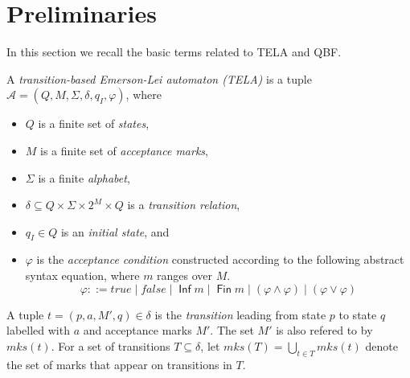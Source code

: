 \documentclass[a4paper,UKenglish,cleveref,autoref,thm-restate]{lipics-v2021}
\DeclareMathOperator{\Inf}{\mathsf{Inf}}
\DeclareMathOperator{\Fin}{\mathsf{Fin}}
\newcommand{\minf}{\mathit{inf}}
\newcommand{\mks}{\mathit{mks}}
\def\false{\mathit{false}}
\def\true{\mathit{true}}
\newcommand{\mA}{\mathcal{A}}
\begin{document}

\section{Preliminaries}\label{sec:prelim}

In this section we recall the basic terms related to TELA and QBF.

\begin{definition}[TELA]
  A \emph{transition-based Emerson-Lei automaton (TELA)} is a tuple
  $\mA =(Q,M,\Sigma,\delta,q_I,\varphi)$, where
  \begin{itemize}
  \item $Q$ is a finite set of \emph{states},
  \item $M$ is a finite set of \emph{acceptance marks},
  \item $\Sigma$ is a finite \emph{alphabet},
  \item $\delta \subseteq Q \times \Sigma \times 2^{M} \times Q$ is a
    \emph{transition relation},
  \item $q_I\in Q$ is an \emph{initial state}, and
  \item $\varphi$ is the \emph{acceptance condition} constructed
    according to the following abstract syntax equation, where $m$
    ranges over $M$.
    $$\varphi ::= \true \mid \false \mid \Inf m \mid \Fin m \mid \left( \varphi \land \varphi \right) \mid \left( \varphi \lor \varphi \right)$$
\end{itemize}
\end{definition}

A tuple $t=(p,a,M',q)\in\delta$ is the \emph{transition} leading from
state $p$ to state $q$ labelled with $a$ and acceptance marks $M'$.
The set $M'$ is also refered to by $\mks(t)$. For a set of transitions
$T\subseteq\delta$, let $\mks(T)=\bigcup_{t\in T}\mks(t)$ denote the
set of marks that appear on transitions in $T$.
\end{document}
